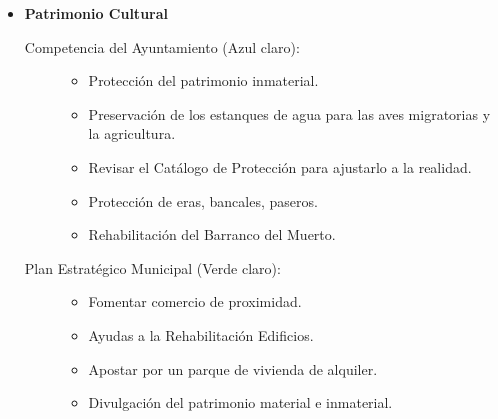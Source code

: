 \begin{itemize}
\begin{itemize}
        \item \textbf{Patrimonio Cultural}
        \begin{description}
            \item[Competencia del Ayuntamiento (Azul claro):]
            \begin{itemize}
                \item Protección del patrimonio inmaterial.
                \item Preservación de los estanques de agua para las aves migratorias y la agricultura.
                \item Revisar el Catálogo de Protección para ajustarlo a la realidad.
                \item Protección de eras, bancales, paseros.
                \item Rehabilitación del Barranco del Muerto.
            \end{itemize}
            \item[Plan Estratégico Municipal (Verde claro):]
            \begin{itemize}
                \item Fomentar comercio de proximidad.
                \item Ayudas a la Rehabilitación Edificios.
                \item Apostar por un parque de vivienda de alquiler.
                \item Divulgación del patrimonio material e inmaterial.
            \end{itemize}
        \end{description}


\end{itemize}
\end{itemize}

